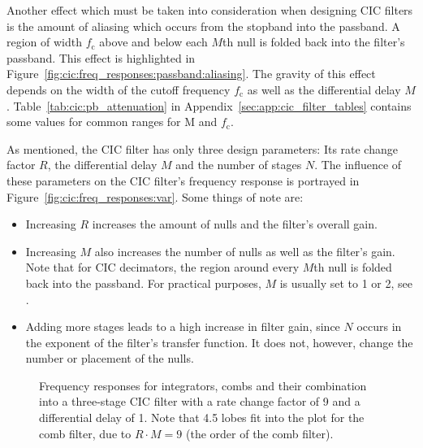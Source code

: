 Another  effect which  must be  taken  into consideration  when designing  CIC
filters is  the amount  of aliasing  which occurs from  the stopband  into the
passband. A region of width $f_\mathrm{c}$ above  and below each $M$th null is
folded  back  into  the  filter's  passband. This  effect  is  highlighted  in
Figure~\ref{fig:cic:freq_responses:passband:aliasing}.   The  gravity of  this
effect  depends  on  the  width  of the  cutoff  frequency  $f_\mathrm{c}$  as
well  as  the  differential delay  $M$. Table~\ref{tab:cic:pb_attenuation}  in
Appendix~\ref{sec:app:cic_filter_tables}  contains  some   values  for  common
ranges for M and $f_\mathrm{c}$.

As  mentioned, the  CIC filter  has  only three  design parameters: Its  rate
change factor  $R$, the differential delay  $M$ and the number  of stages $N$.
The influence  of these parameters  on the  CIC filter's frequency  response is
portrayed in Figure~\ref{fig:cic:freq_responses:var}. Some things of note are:
\begin{itemize}\tightlist
    \item
        Increasing $R$ increases the amount  of nulls and the filter's overall
        gain.
    \item
        Increasing  $M$ also  increases the  number of  nulls as  well as  the
        filter's gain.  Note that for  CIC decimators, the region around every
        $M$th null is folded back  into the passband.  For practical purposes,
        $M$ is usually set to \num{1} or \num{2}, see \cite{1163535}.
    \item
        Adding more stages leads to a  high increase in filter gain, since $N$
        occurs in the exponent of the filter's transfer function. It does not,
        however, change the number or placement of the nulls.
\end{itemize}

\begin{figure}
    \centering
        
        \caption[Frequency Responses for Integrators, Combs and CIC Filters]{%
            Frequency responses  for integrators, combs and  their combination
            into a three-stage CIC filter with a rate change factor of \num{9}
            and a  differential delay of  \num{1}.  Note that  \num{4.5} lobes
            fit into the plot for the comb  filter, due to $R\cdot M = 9$ (the
            order of the  comb filter).%
        }
        \label{fig:cic:freq_responses}
\end{figure}

